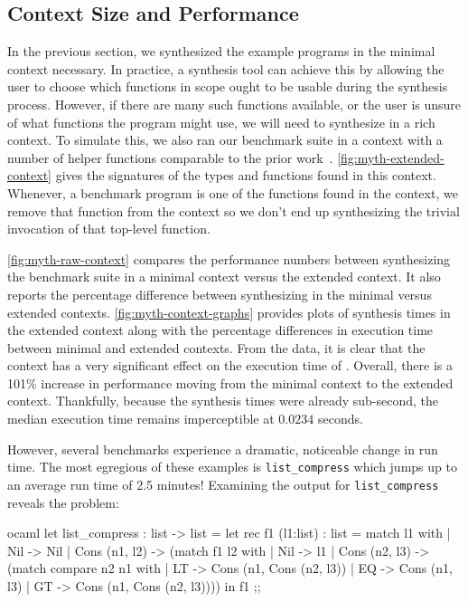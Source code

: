 \subsection{Context Size and Performance}
\label{subsec:context-size-and-performance}



In the previous section, we synthesized the example programs in the minimal context necessary.
In practice, a synthesis tool can achieve this by allowing the user to choose which functions in scope ought to be usable during the synthesis process.
However, if there are many such functions available, or the user is unsure of what functions the program might use, we will need to synthesize in a rich context.
To simulate this, we also ran our benchmark suite in a context with a number of helper functions comparable to the prior work~.
\autoref{fig:myth-extended-context} gives the signatures of the types and functions found in this context.
Whenever, a benchmark program is one of the functions found in the context, we remove that function from the context so we don't end up synthesizing the trivial invocation of that top-level function.




\autoref{fig:myth-raw-context} compares the performance numbers between synthesizing the benchmark suite in a minimal context versus the extended context.
It also reports the percentage difference between synthesizing in the minimal versus extended contexts.
\autoref{fig:myth-context-graphs} provides plots of synthesis times in the extended context along with the percentage differences in execution time between minimal and extended contexts.
From the data, it is clear that the context has a very significant effect on the execution time of \myth{}.
Overall, there is a 101\% increase in performance moving from the minimal context to the extended context.
Thankfully, because the synthesis times were already sub-second, the median execution time remains imperceptible at $0.0234$ seconds.

However, several benchmarks experience a dramatic, noticeable change in run time.
The most egregious of these examples is \texttt{list\_compress} which jumps up to an average run time of 2.5 minutes!
Examining the output for \texttt{list\_compress} reveals the problem:

\begin{center}
  \begin{cminted}{ocaml}
let list_compress : list -> list =
  let rec f1 (l1:list) : list =
    match l1 with
    | Nil -> Nil
    | Cons (n1, l2) ->
      (match f1 l2 with
      | Nil -> l1
      | Cons (n2, l3) ->
        (match compare n2 n1 with
        | LT -> Cons (n1, Cons (n2, l3))
        | EQ -> Cons (n1, l3)
        | GT -> Cons (n1, Cons (n2, l3))))
in
  f1
;;
  \end{cminted}
\end{center}


